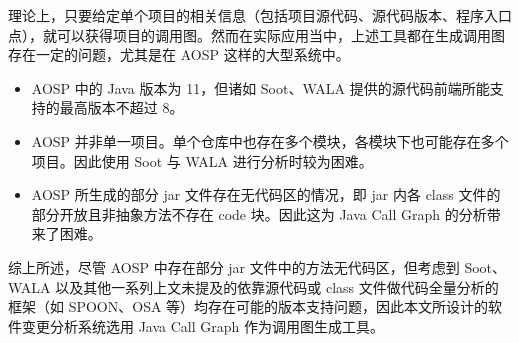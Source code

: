 理论上，只要给定单个项目的相关信息（包括项目源代码、源代码版本、程序入口点），就可以获得项目的调用图。然而在实际应用当中，上述工具都在生成调用图存在一定的问题，尤其是在 AOSP 这样的大型系统中。

\begin{itemize}
    \item AOSP 中的 Java 版本为 11，但诸如 Soot、WALA 提供的源代码前端所能支持的最高版本不超过 8。
    \item AOSP 并非单一项目。单个仓库中也存在多个模块，各模块下也可能存在多个项目。因此使用 Soot 与 WALA 进行分析时较为困难。
    \item AOSP 所生成的部分 jar 文件存在无代码区的情况，即 jar 内各 class 文件的部分开放且非抽象方法不存在 code 块。因此这为 Java Call Graph 的分析带来了困难。
\end{itemize}

综上所述，尽管 AOSP 中存在部分 jar 文件中的方法无代码区，但考虑到 Soot、WALA 以及其他一系列上文未提及的依靠源代码或 class 文件做代码全量分析的框架（如 SPOON、OSA 等）均存在可能的版本支持问题，因此本文所设计的软件变更分析系统选用 Java Call Graph 作为调用图生成工具。
